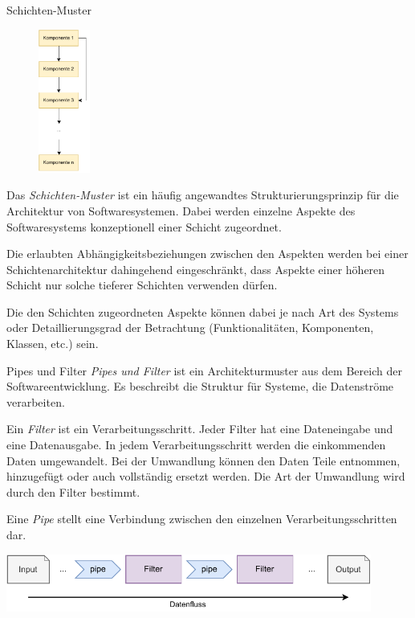 \begin{defi}{Schichten-Muster}
    \begin{figure}
        \centering
        \includegraphics[width=0.15\textwidth]{includes/figures/defi_schichten.pdf}
    \end{figure}
    Das \emph{Schichten-Muster} ist ein häufig angewandtes Strukturierungsprinzip für die Architektur von Softwaresystemen.
    Dabei werden einzelne Aspekte des Softwaresystems konzeptionell einer Schicht zugeordnet.

    Die erlaubten Abhängigkeitsbeziehungen zwischen den Aspekten werden bei einer Schichtenarchitektur dahingehend eingeschränkt, dass Aspekte einer höheren Schicht nur solche tieferer Schichten verwenden dürfen.

    Die den Schichten zugeordneten Aspekte können dabei je nach Art des Systems oder Detaillierungsgrad der Betrachtung (Funktionalitäten, Komponenten, Klassen, etc.) sein.

    \vspace{5em}
\end{defi}

\begin{defi}{Pipes und Filter}
    \emph{Pipes und Filter}  ist ein Architekturmuster aus dem Bereich der Softwareentwicklung. Es beschreibt die Struktur für Systeme, die Datenströme verarbeiten.

    Ein \emph{Filter} ist ein Verarbeitungsschritt.
    Jeder Filter hat eine Dateneingabe und eine Datenausgabe.
    In jedem Verarbeitungsschritt werden die einkommenden Daten umgewandelt.
    Bei der Umwandlung können den Daten Teile entnommen, hinzugefügt oder auch vollständig ersetzt werden.
    Die Art der Umwandlung wird durch den Filter bestimmt.

    Eine \emph{Pipe} stellt eine Verbindung zwischen den einzelnen Verarbeitungsschritten dar.

    \begin{center}
        \includegraphics[width=0.9\textwidth]{includes/figures/defi_pipes_und_filter.pdf}
    \end{center}
\end{defi}

